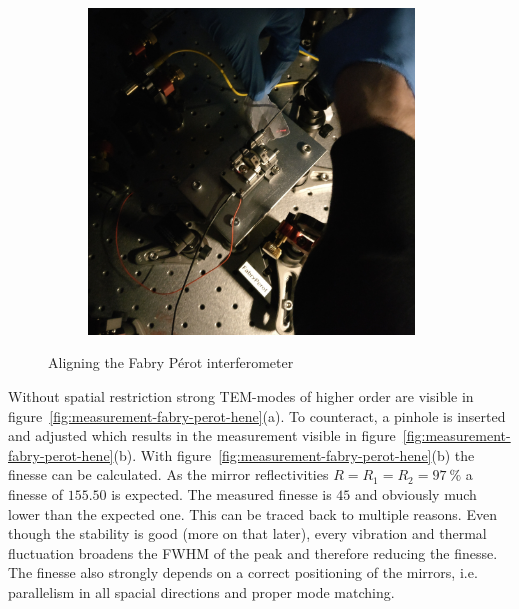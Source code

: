 \begin{figure}[H]
\begin{subfigure}[b]{0.48\textwidth}
		\includegraphics[width=0.95\textwidth]{figures/fabry-perot/setup/confocal-setup-higher-modes-2}
		\caption{}
		\label{fig:confocal-setup-higher-modes-2}
	\end{subfigure}
	\caption{Aligning the Fabry Pérot interferometer}
	\label{fig:align-fpi}
\end{figure}

Without spatial restriction strong TEM-modes of higher order are visible in figure~\ref{fig:measurement-fabry-perot-hene}(a).
To counteract, a pinhole is inserted and adjusted which results in the measurement visible in figure~\ref{fig:measurement-fabry-perot-hene}(b).
With figure~\ref{fig:measurement-fabry-perot-hene}(b) the finesse can be calculated.
As the mirror reflectivities $R=R_1=R_2=\SI{97}{\percent}$ a finesse of $155.50$ is expected.
The measured finesse is $45$ and obviously much lower than the expected one.
This can be traced back to multiple reasons.
Even though the stability is good (more on that later), every vibration and thermal fluctuation broadens the \ac{FWHM} of the peak and therefore reducing the finesse.
The finesse also strongly depends on a correct positioning of the mirrors, i.e. parallelism in all spacial directions and proper mode matching. 

